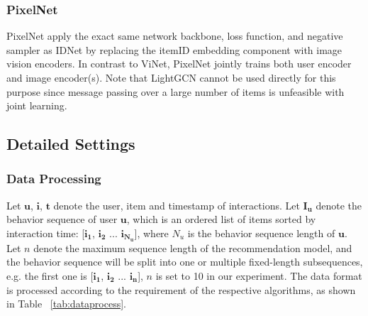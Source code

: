 \documentclass[sigconf]{acmart}
\begin{document}
\subsubsection{PixelNet}
PixelNet apply the exact same network backbone, loss function, and negative sampler as IDNet by replacing the itemID embedding component with image vision encoders. 
In contrast to ViNet, PixelNet jointly  trains both user encoder and image encoder(s).
Note that LightGCN cannot be used directly for this purpose since message passing over a large number of items is unfeasible with  joint learning.


\subsection{Detailed Settings}

\subsubsection{Data Processing}
Let $\mathbf{u}$, $\mathbf{i}$, $\mathbf{t}$ denote the user, item and timestamp of interactions. 
Let $\mathbf{I_u}$ denote the behavior sequence of user $\mathbf{u}$, which is an ordered  list of items sorted by interaction time: [$\mathbf{i_1}$, $\mathbf{i_2}$ ... $\mathbf{i_{N_u}}$], where $N_u$ is the behavior sequence length of  $\mathbf{u}$. Let $n$ denote the maximum sequence length of the recommendation model, and the behavior sequence will be split into one or multiple fixed-length subsequences, e.g. the first one is [$\mathbf{i_1}$, $\mathbf{i_2}$ ... $\mathbf{i_n}$], $n$ is set to 10 in our experiment. The data format is processed according to the requirement of the respective algorithms, as shown in Table ~\ref{tab:dataprocess}.
\end{document}
